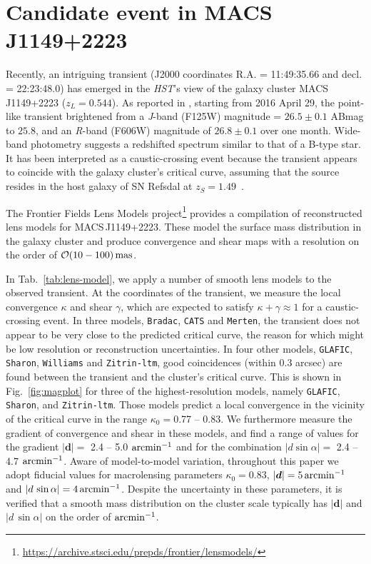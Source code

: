 \documentclass{aastex6}
\newcommand{\reffig}[1]{Fig.~\ref{fig:#1}}
\newcommand{\reftab}[1]{Tab.~\ref{tab:#1}}
\def\bfd{\boldsymbol{d}}
\begin{document}
\section{Candidate event in MACS\,J1149+2223}
\label{app:application}

Recently, an intriguing transient (J2000 coordinates R.A. = 11:49:35.66 and decl. = 22:23:48.0) has emerged in the {\em HST}'s view of the galaxy cluster MACS\,J1149+2223 ($z_L=0.544$). As reported in \cite{2016ATel.9097....1K}, starting from 2016 April 29, the point-like transient brightened from a {\em J}-band (F125W) magnitude = $26.5 \pm 0.1$ ABmag to $25.8$, and an {\em R}-band (F606W) magnitude of $26.8 \pm 0.1$ over one month. Wide-band photometry suggests a redshifted spectrum similar to that of a B-type star. It has been interpreted as a caustic-crossing event because the transient appears to coincide with the galaxy cluster's critical curve, assuming that the source resides in the host galaxy of SN Refsdal at $z_S=1.49$~\citep{Kelly:2014mwa}.

The Frontier Fields Lens Models project\footnote{\url{https://archive.stsci.edu/prepds/frontier/lensmodels/}} provides a compilation of reconstructed lens models for MACS\,J1149+2223. These model the surface mass distribution in the galaxy cluster and produce convergence and shear maps with a resolution on the order of $\mathcal{O}(10 - 100)\,{\rm mas}$.

In \reftab{lens-model}, we apply a number of smooth lens models to the observed transient. At the coordinates of the transient, we measure the local convergence $\kappa$ and shear $\gamma$, which are expected to satisfy $\kappa+\gamma \approx 1$ for a caustic-crossing event.  In three models, {\tt Bradac}, {\tt CATS} and {\tt Merten}, the transient does not appear to be very close to the predicted critical curve, the reason for which might be low resolution or reconstruction uncertainties. In four other models, {\tt GLAFIC}, {\tt Sharon}, {\tt Williams} and {\tt Zitrin-ltm}, good coincidences (within 0.3 arcsec) are found between the transient and the cluster's critical curve. This is shown in \reffig{magplot} for three of the highest-resolution models, namely {\tt GLAFIC}, {\tt Sharon}, and {\tt Zitrin-ltm}. Those models predict a local convergence in the vicinity of the critical curve in the range $\kappa_0 = $0.77 -- 0.83. We furthermore measure the gradient of convergence and shear in these models, and find a range of values for the gradient $|\bfd|=$ 2.4 -- 5.0 ${\rm arcmin}^{-1}$ and for the combination $|d\sin\alpha| =$ 2.4 -- 4.7 ${\rm arcmin}^{-1}$. Aware of model-to-model variation, throughout this paper we adopt fiducial values for macrolensing parameters $\kappa_0=0.83$, $|\bfd|=5\,{\rm arcmin}^{-1}$ and $|d\,\sin\alpha|=4\,{\rm arcmin}^{-1}$. Despite the uncertainty in these parameters, it is verified that a smooth mass distribution on the cluster scale typically has $|\bfd|$ and $|d\,\sin\alpha|$ on the order of ${\rm arcmin}^{-1}$.
 
\end{document}
